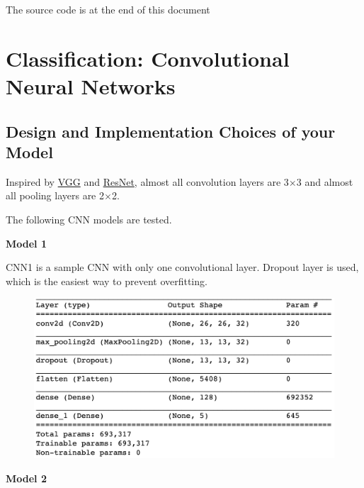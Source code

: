 \documentclass[12pt]{article}
\begin{document}
\noindent
{\LARGE The source code is at the end of this document}
\section{Classification: Convolutional Neural Networks}

\subsection{Design and Implementation Choices of your Model}

Inspired by \href{https://arxiv.org/pdf/1409.1556.pdf}{VGG} and \href{https://arxiv.org/pdf/1512.03385.pdf}{ResNet}, almost all convolution layers are 3$\times$3 and almost all pooling layers are 2$\times$2.

The following CNN models are tested. 

\textbf{Model 1}

CNN1 is a sample CNN with only one convolutional layer. Dropout layer is used, which is the easiest way to prevent overfitting.
\begin{figure}[H]
\begin{center}
    \includegraphics[width=1.0\textwidth]{../plots/1.png}
\end{center}
\end{figure}
\vspace*{-1.0cm}

\textbf{Model 2}
\end{document}
